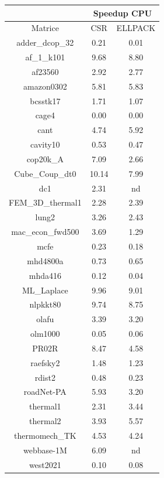 \documentclass[12pt,halfline,a4paper]{ouparticle}
\begin{document}
\begin{center}
\begin{tabular}{|| c | c | c ||} 
\hline
 & \multicolumn{2}{c||}{Speedup CPU}\\
\hline
Matrice&CSR&ELLPACK\\
\hline
adder\_dcop\_32 & 0.21 & 0.01 \\
\hline
af\_1\_k101 & 9.68 & 8.80 \\
\hline
af23560 & 2.92 & 2.77 \\
\hline
amazon0302 & 5.81 & 5.83 \\
\hline
bcsstk17 & 1.71 & 1.07 \\
\hline
cage4 & 0.00 & 0.00 \\
\hline
cant & 4.74 & 5.92 \\
\hline
cavity10 & 0.53 & 0.47 \\
\hline
cop20k\_A & 7.09 & 2.66 \\
\hline
Cube\_Coup\_dt0 & 10.14 & 7.99 \\
\hline
dc1 & 2.31 & nd \\
\hline
FEM\_3D\_thermal1 & 2.28 & 2.39 \\
\hline
lung2 & 3.26 & 2.43 \\
\hline
mac\_econ\_fwd500 & 3.69 & 1.29 \\
\hline
mcfe & 0.23 & 0.18 \\
\hline
mhd4800a & 0.73 & 0.65 \\
\hline
mhda416 & 0.12 & 0.04 \\
\hline
ML\_Laplace & 9.96 & 9.01 \\
\hline
nlpkkt80 & 9.74 & 8.75 \\
\hline
olafu & 3.39 & 3.20 \\
\hline
olm1000 & 0.05 & 0.06 \\
\hline
PR02R & 8.47 & 4.58 \\
\hline
raefsky2 & 1.48 & 1.23 \\
\hline
rdist2 & 0.48 & 0.23 \\
\hline
roadNet-PA & 5.93 & 3.20 \\
\hline
thermal1 & 2.31 & 3.44 \\
\hline
thermal2 & 3.93 & 5.57 \\
\hline
thermomech\_TK & 4.53 & 4.24 \\
\hline
webbase-1M & 6.09 & nd \\
\hline
west2021 & 0.10 & 0.08 \\
\hline
\end{tabular}
\end{center}
\end{document}
